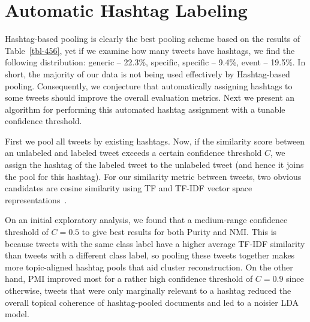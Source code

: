 \documentclass{sig-alternate}
\newcommand{\secmoveup}{\vspace{-1.mm}}
\begin{document}
\secmoveup
\section{Automatic Hashtag Labeling}

Hashtag-based pooling is clearly the best pooling scheme based on the
results of Table~\ref{tbl-456}, yet if we examine how many tweets have
hashtags, we find the following distribution: generic -- 22.3\%,
specific, specific -- 9.4\%, event -- 19.5\%.  In short, the majority
of our data is not being used effectively by Hashtag-based pooling.
Consequently, we conjecture that automatically assigning hashtags to
some tweets should improve the overall evaluation metrics.
Next we present an algorithm for performing this automated hashtag
assignment with a tunable confidence threshold.

\vspace{1mm}  First we pool
all tweets by existing hashtags.  Now, if the similarity score between
an unlabeled and labeled tweet exceeds a certain confidence threshold
$C$, we assign the hashtag of the labeled tweet to the unlabeled tweet
(and hence it joins the pool for this hashtag).  For our similarity
metric between tweets, two obvious candidates are cosine similarity
using TF and TF-IDF vector space representations~\cite{salton83Introduction}.  

On an initial exploratory analysis, we found that a medium-range
confidence threshold of $C=0.5$ to give best results for both Purity and NMI. 
This is because tweets with the same class label have a higher average TF-IDF
similarity than tweets with a different class label, so pooling
these tweets together makes more topic-aligned hashtag pools that aid
cluster reconstruction.  On the other hand, PMI improved most for a
rather high confidence threshold of $C=0.9$ since otherwise, tweets
that were only marginally relevant to a hashtag reduced the overall
topical coherence of hashtag-pooled documents and led to a noisier LDA
model.
\end{document}
